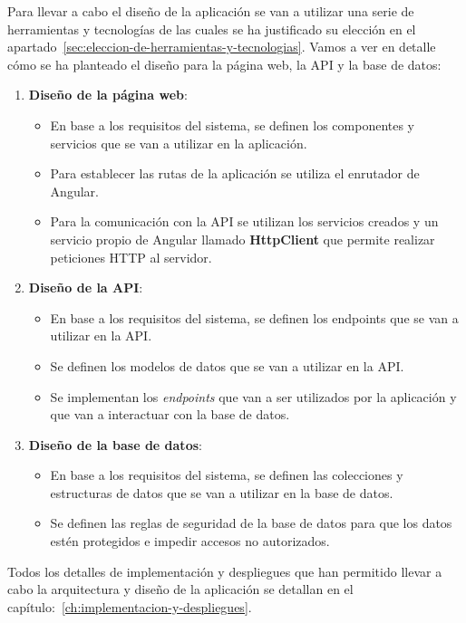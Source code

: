 Para llevar a cabo el diseño de la aplicación se van a utilizar una serie de herramientas y tecnologías de las cuales
se ha justificado su elección en el apartado~\ref{sec:eleccion-de-herramientas-y-tecnologias}. Vamos a ver en detalle
cómo se ha planteado el diseño para la página web, la API y la base de datos:

\begin{enumerate}
    \item \textbf{Diseño de la página web}:
    \begin{itemize}
        \item En base a los requisitos del sistema, se definen los componentes y servicios que se van a utilizar en la
        aplicación.
        \item Para establecer las rutas de la aplicación se utiliza el enrutador de Angular.
        \item Para la comunicación con la API se utilizan los servicios creados y un servicio propio de Angular llamado
        \textbf{HttpClient} que permite realizar peticiones HTTP al servidor.
    \end{itemize}
    \item \textbf{Diseño de la API}:
    \begin{itemize}
        \item En base a los requisitos del sistema, se definen los endpoints que se van a utilizar en la API.
        \item Se definen los modelos de datos que se van a utilizar en la API.
        \item Se implementan los \textit{endpoints} que van a ser utilizados por la aplicación y que van
        a interactuar con la base de datos.
    \end{itemize}
    \item \textbf{Diseño de la base de datos}:
    \begin{itemize}
        \item En base a los requisitos del sistema, se definen las colecciones y estructuras de datos que se van a utilizar
        en la base de datos.
        \item Se definen las reglas de seguridad de la base de datos para que los datos estén protegidos e impedir
        accesos no autorizados.
    \end{itemize}
\end{enumerate}

Todos los detalles de implementación y despliegues que han permitido llevar a cabo la arquitectura y diseño de la aplicación se
detallan en el capítulo:~\ref{ch:implementacion-y-despliegues}.

